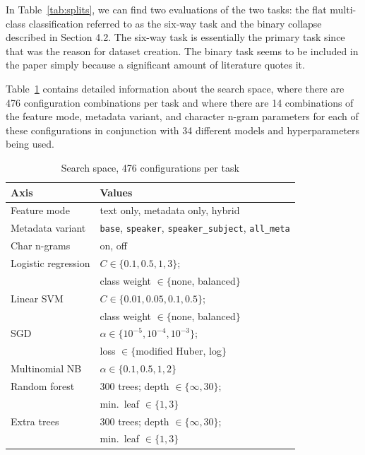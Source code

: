 \documentclass[10pt,twocolumn,twoside,a4paper]{article}
\begin{document}
In Table~\ref{tab:splits}, we can find two evaluations of the two tasks: the flat multi-class classification referred to as the six-way task and the binary collapse described in Section 4.2. The six-way task is essentially the primary task since that was the reason for dataset creation. The binary task seems to be included in the paper simply because a significant amount of literature quotes it.

Table~\ref{tab:grid} contains detailed information about the search space, where there are 476 configuration combinations per task and where there are 14 combinations of the feature mode, metadata variant, and character n-gram parameters for each of these configurations in conjunction with 34 different models and hyperparameters being used.

\begin{table}[t]
\caption{Search space, 476 configurations per task}
\label{tab:grid}
\centering
\footnotesize
\begin{tabular}{@{}ll@{}}
\toprule
Axis & Values \\
\midrule
Feature mode & text only, metadata only, hybrid \\
Metadata variant & \texttt{base}, \texttt{speaker},
                   \texttt{speaker\_subject}, \texttt{all\_meta} \\
Char n-grams & on, off \\
\midrule
Logistic regression & $C \in \{0.1, 0.5, 1, 3\}$; \\
                    & class weight $\in \{$none, balanced$\}$ \\
Linear SVM & $C \in \{0.01, 0.05, 0.1, 0.5\}$; \\
           & class weight $\in \{$none, balanced$\}$ \\
SGD        & $\alpha \in \{10^{-5},10^{-4},10^{-3}\}$; \\
           & loss $\in \{$modified Huber, log$\}$ \\
Multinomial NB & $\alpha \in \{0.1, 0.5, 1, 2\}$ \\
Random forest  & 300 trees; depth $\in \{\infty, 30\}$; \\
               & min.\ leaf $\in \{1,3\}$ \\
Extra trees    & 300 trees; depth $\in \{\infty, 30\}$; \\
               & min.\ leaf $\in \{1,3\}$ \\
\bottomrule
\end{tabular}
\end{table}
\end{document}
